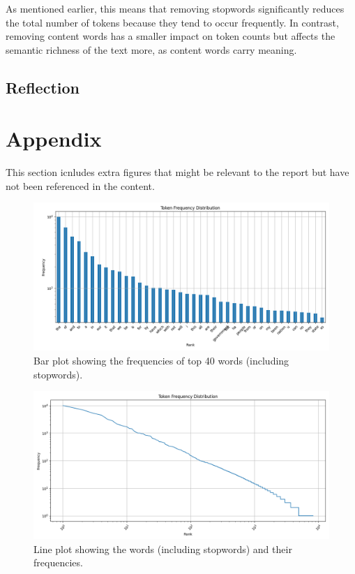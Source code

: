 \documentclass[titlepage]{article}
\begin{document}
As mentioned earlier, this means that removing stopwords significantly reduces the total number of 
tokens because they tend to occur frequently. In contrast, removing content words has a smaller
impact on token counts but affects the semantic richness of the text more, as content words carry meaning.

\subsection{Reflection}

\section{Appendix}
This section icnludes extra figures that might be relevant to the report but have not been referenced 
in the content.

\begin{figure}[H]
    \includegraphics[width=\textwidth]{figures/bar_plot_stopwords.png}
    \caption{Bar plot showing the frequencies of top 40 words (including stopwords).}
    \label{fig:FigBarStop}
\end{figure}

\begin{figure}[H]
    \centering
    \includegraphics[width=\textwidth]{figures/line_plot_stopwords.png}
    \caption{Line plot showing the words (including stopwords) and their frequencies.}
    \label{fig:FigLineStop}
\end{figure}
\end{document}
